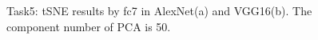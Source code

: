 \documentclass[12pt]{report}
\begin{document}
\begin{outline}
\begin{figure}[!h]
  \centering
  \caption{Task5: tSNE results by fc7 in AlexNet(a) and VGG16(b). The component number of PCA is 50.}
\label{fig:short}
\end{figure}


\end{outline}
\end{document}
